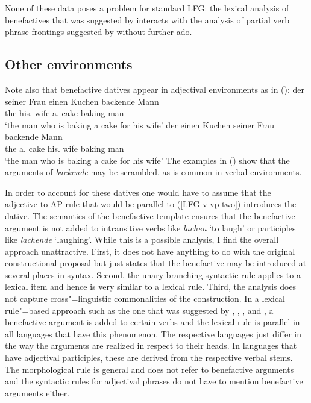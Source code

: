 None of these data poses a problem for standard LFG: the lexical analysis of benefactives that was suggested by \citet{Toivonen2013a}
interacts with the analysis of partial verb phrase frontings suggested by \citet{ZK2002a} without
further ado.

\subsection{Other environments}
\label{sec-adjectival-participles-benefactive}

Note also that benefactive datives appear in adjectival environments as in ():
\eal
\ex
\gll der seiner Frau einen Kuchen backende Mann\\
     the his.\dat{} wife a.\acc{} cake baking man\\
\glt `the man who is baking a cake for his wife'
\ex
\gll der einen Kuchen seiner Frau backende Mann\\
     the a.\acc{} cake  his.\dat{} wife baking man\\
\glt `the man who is baking a cake for his wife'
\zl
The examples in () show that the arguments of \emph{backende} may be scrambled, as is common
in verbal environments.

In order to account for these datives one would have to assume that the adjective-to-AP rule that
would be parallel to (\ref{LFG-v-vp-two}) introduces the dative. The semantics of the benefactive
template ensures that the benefactive argument is not added to intransitive
verbs like \emph{lachen} `to laugh' or participles like \emph{lachende} `laughing'. 
While this is a possible analysis, I find the overall approach unattractive. First, it does not have anything to do with
the original constructional proposal but just states that the benefactive may be introduced at
several places in syntax. Second, the unary branching syntactic rule applies to a lexical
item and hence is very similar to a lexical rule. Third, the analysis does not capture cross"=linguistic commonalities of the
construction. In a lexical rule"=based approach such as the one that was suggested by
\citet[Section~5]{BC99a}, \citet{Cook2006a-u}, \citet{Kibort2008a}, and \citet{Toivonen2013a}, a
benefactive argument is added to certain verbs and the lexical rule is parallel in all languages
that have this phenomenon. The respective languages just differ in the way the arguments are
realized in respect to their heads. In languages that have adjectival participles, these are derived
from the respective verbal stems. The morphological rule is general and does not refer to benefactive
arguments and the syntactic rules for adjectival phrases do not have to mention benefactive
arguments either. 


